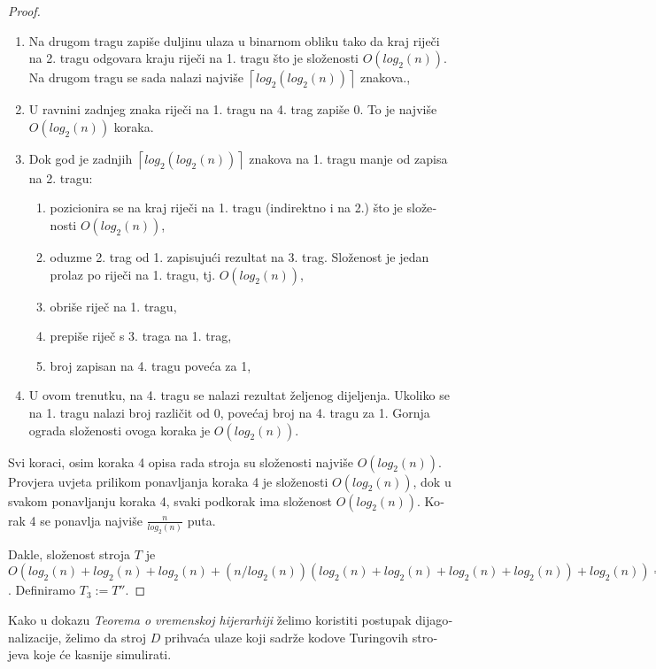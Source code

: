\documentclass[12pt]{rectors}
\begin{document}
\begin{otherlanguage}{croatian}
\begin{proof}
\begin{enumerate}
    \item Na drugom tragu zapiše duljinu ulaza u binarnom obliku tako da kraj riječi na 2. tragu odgovara kraju riječi na 1. tragu što je složenosti $O(log_2(n))$.
    Na drugom tragu se sada nalazi
    najviše $\left \lceil{log_2(log_2(n))}\right \rceil$  znakova.,
    \item U ravnini zadnjeg znaka riječi na 1. tragu na 4. trag zapiše $0$. To je najviše $O(log_2(n))$ koraka.
    \item Dok god je zadnjih $\left \lceil{log_2(log_2(n))}\right \rceil$ znakova na 1. tragu manje od zapisa na 2. tragu:
    \begin{enumerate}
        \item pozicionira se na kraj riječi na 1. tragu (indirektno i na 2.) što je složenosti $O(log_2(n))$,
        \item oduzme 2. trag od 1. zapisujući rezultat na 3. trag. Složenost je jedan prolaz po riječi na 1. tragu, tj. $O(log_2(n))$,
        \item obriše riječ na 1. tragu,
        \item prepiše riječ s 3. traga na 1. trag, 
        \item broj zapisan na 4. tragu poveća za 1, 
    \end{enumerate}
    \item U ovom trenutku, na 4. tragu se nalazi rezultat željenog dijeljenja. Ukoliko se na 1. tragu nalazi broj različit od 0, povećaj broj na 4. tragu za 1. Gornja ograda složenosti ovoga koraka je $O(log_2(n))$.
\end{enumerate}
Svi koraci, osim koraka 4 opisa rada stroja su složenosti najviše $O(log_2(n))$.
Provjera uvjeta prilikom ponavljanja koraka 4 je složenosti $O(log_2(n))$, dok
u svakom ponavljanju koraka 4, svaki podkorak ima složenost $O(log_2(n))$. Korak 4 se ponavlja
najviše $\frac{n}{log_2(n)}$ puta. 

Dakle, složenost stroja $T$ je $O(log_2(n)+log_2(n)+log_2(n)+(n/log_2(n))(log_2(n)+log_2(n)+log_2(n)+log_2(n))+log_2(n)) = O(n)$. 
Definiramo $T_3 := T''$.

\end{proof}

Kako u dokazu \textit{Teorema o vremenskoj hijerarhiji} želimo koristiti
postupak dijagonalizacije, želimo da stroj $D$ prihvaća ulaze koji sadrže kodove Turingovih strojeva koje će kasnije simulirati.


\end{otherlanguage}
\end{document}
